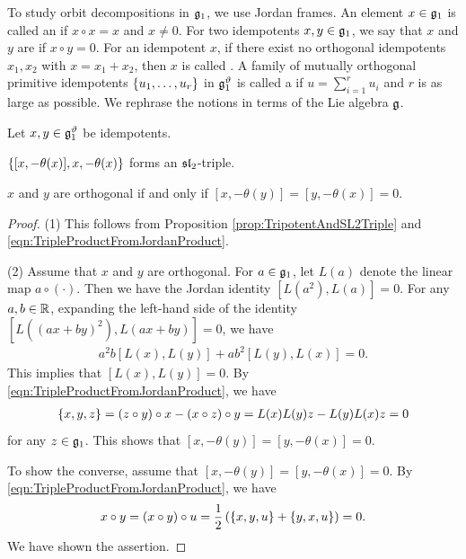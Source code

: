 To study orbit decompositions in $\mathfrak{g}_1$, we use Jordan frames.
An element $x \in \mathfrak{g}_1$ is called an  if $x \circ x = x$ and $x \neq 0$.
For two idempotents $x, y \in \mathfrak{g}_1$, we say that $x$ and $y$ are  if $x \circ y = 0$.
For an idempotent $x$, if there exist no orthogonal idempotents $x_1, x_2$ with $x = x_1 + x_2$, then $x$ is called .
A family of mutually orthogonal primitive idempotents $\left\{u_1, \ldots, u_r \right\}$ in $\mathfrak{g}_1^{\vartheta}$ is called a  if $u = \sum_{i=1}^r u_i$ and $r$ is as large as possible.
We rephrase the notions in terms of the Lie algebra $\mathfrak{g}$.

\begin{proposition} \label{prop:IdempotentAndOrthogonal}
	Let $x, y \in \mathfrak{g}_1^\vartheta$ be idempotents.
	\begin{enumparen}
		\item $\left\{[x, -\theta(x)], x, -\theta(x) \right\}$ forms an $\mathfrak{sl}_2$-triple.
		\item $x$ and $y$ are orthogonal if and only if $[x, -\theta(y)] = [y, -\theta(x)] = 0$.
	\end{enumparen}
\end{proposition}

\begin{proof}
	(1) This follows from Proposition \ref{prop:TripotentAndSL2Triple} and \eqref{eqn:TripleProductFromJordanProduct}.

	(2) Assume that $x$ and $y$ are orthogonal.
	For $a \in \mathfrak{g}_1$, let $L(a)$ denote the linear map $a\circ (\cdot)$.
	Then we have the Jordan identity $[L(a^2), L(a)] = 0$.
	For any $a, b\in \mathbb{R}$, expanding the left-hand side of the identity $[L((ax+by)^2), L(ax + by)] = 0$,
	we have
	\begin{align*}
		a^2b[L(x), L(y)] + ab^2[L(y), L(x)] = 0.
	\end{align*}
	This implies that $[L(x), L(y)] = 0$.
	By \eqref{eqn:TripleProductFromJordanProduct}, we have
	\begin{align*}
		\{x, y, z\} = (z \circ y) \circ x - (x \circ z) \circ y = L(x)L(y)z - L(y)L(x)z = 0
	\end{align*}
	for any $z \in \mathfrak{g}_1$.
	This shows that $[x, -\theta(y)] =  [y, -\theta(x)] = 0$.

	To show the converse, assume that $[x, -\theta(y)] = [y, -\theta(x)] = 0$.
	By \eqref{eqn:TripleProductFromJordanProduct}, we have
	\begin{align*}
		x\circ y = (x \circ y) \circ u = \frac{1}{2}\left(\{x, y, u\} + \{y, x, u\}\right) = 0.
	\end{align*}
	We have shown the assertion.
\end{proof}

